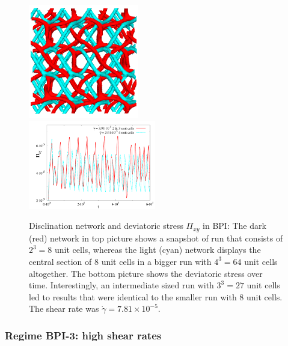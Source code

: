 \documentclass[aps,pre,reprint,superscriptaddress, twocolumn]{revtex4}
\newcommand{\e}[1]{\times10^{#1}}
\newcommand{\gd}{\dot{\gamma}}
\begin{document}
\begin{figure}[htpb]
\includegraphics[width=0.43\textwidth]{disc+y-600k-run911_run1163.png}\\
\includegraphics[width=0.495\textwidth]{stress_bp1_2uc_4uc.pdf}
\caption{Disclination network and deviatoric stress $\Pi_{xy}$ in BPI: 
The dark (red) network in top picture shows a snapshot of run that consists 
of $2^3=8$ unit cells, whereas the light (cyan) network displays the 
central section of 8 unit cells in a bigger run with $4^3=64$ unit cells altogether. 
The bottom picture shows the deviatoric stress over time. Interestingly, 
an intermediate sized run with $3^3=27$ unit cells led to results that 
were identical to the smaller run with 8 unit cells. The shear rate was $\gd=7.81\e{-5}$.
}
\label{bp1-2uc4uc}
\end{figure}

\subsubsection{Regime BPI-3: high shear rates}
\end{document}
